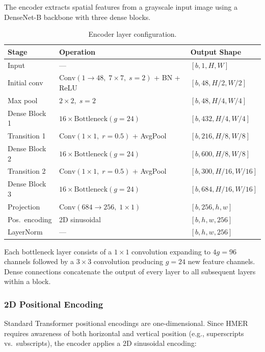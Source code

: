 \documentclass[11pt,a4paper]{article}
\begin{document}
The encoder extracts spatial features from a grayscale input image using a DenseNet-B backbone with three dense blocks.

\begin{table}[H]
\centering
\caption{Encoder layer configuration.}
\label{tab:encoder}
\begin{tabular}{lll}
\toprule
\textbf{Stage} & \textbf{Operation} & \textbf{Output Shape} \\
\midrule
Input         & ---                                          & $[b, 1, H, W]$ \\
Initial conv  & $\text{Conv}(1{\to}48,\; 7{\times}7,\; s{=}2)$ + BN + ReLU & $[b, 48, H/2, W/2]$ \\
Max pool      & $2{\times}2,\; s{=}2$                        & $[b, 48, H/4, W/4]$ \\
Dense Block 1 & $16 \times \text{Bottleneck}(g{=}24)$        & $[b, 432, H/4, W/4]$ \\
Transition 1  & $\text{Conv}(1{\times}1,\; r{=}0.5)$ + AvgPool   & $[b, 216, H/8, W/8]$ \\
Dense Block 2 & $16 \times \text{Bottleneck}(g{=}24)$        & $[b, 600, H/8, W/8]$ \\
Transition 2  & $\text{Conv}(1{\times}1,\; r{=}0.5)$ + AvgPool   & $[b, 300, H/16, W/16]$ \\
Dense Block 3 & $16 \times \text{Bottleneck}(g{=}24)$        & $[b, 684, H/16, W/16]$ \\
Projection    & $\text{Conv}(684{\to}256,\; 1{\times}1)$     & $[b, 256, h, w]$ \\
Pos.\ encoding & 2D sinusoidal                               & $[b, h, w, 256]$ \\
LayerNorm     & ---                                          & $[b, h, w, 256]$ \\
\bottomrule
\end{tabular}
\end{table}

Each bottleneck layer consists of a $1{\times}1$ convolution expanding to $4g = 96$ channels followed by a $3{\times}3$ convolution producing $g = 24$ new feature channels. Dense connections concatenate the output of every layer to all subsequent layers within a block.

\subsubsection{2D Positional Encoding}

Standard Transformer positional encodings are one-dimensional. Since HMER requires awareness of both horizontal and vertical position (e.g., superscripts vs.\ subscripts), the encoder applies a 2D sinusoidal encoding:
\end{document}

